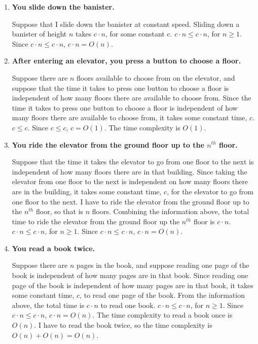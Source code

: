 \documentclass[10pt]{article}
\begin{document}
\begin{enumerate}
\begin{enumerate}
				\item \textbf{You slide down the banister.}
					
					\vspace{0.5cm}
					Suppose that I slide down the banister at constant speed. Sliding down a banister of height $n$ takes $c \cdot n$, for some constant c. $c \cdot n \leq c \cdot n$, for $n \geq 1$. Since $c \cdot n \leq c \cdot n$, $c \cdot n = O(n)$.
					\vspace{0.5cm}
				
				\item \textbf{After entering an elevator, you press a button to choose a floor.}
					
					\vspace{0.5cm}
					Suppose there are $n$ floors available to choose from on the elevator, and suppose that the time it takes to press one button to choose a floor is independent of how many floors there are available to choose from. Since the time it takes to press one button to choose a floor is independent of how many floors there are available to choose from, it takes some constant time, $c$. $c \leq c$. Since $c \leq c$, $c = O(1)$. The time complexity is $O(1)$.
					\vspace{0.5cm}
				
				\item \textbf{You ride the elevator from the ground floor up to the $n^{th}$ floor.}
					
					\vspace{0.5cm}
					Suppose that the time it takes the elevator to go from one floor to the next is independent of how many floors there are in that building. Since taking the elevator from one floor to the next is independent on how many floors there are in the building, it takes some constant time, $c$, for the elevator to go from one floor to the next. I have to ride the elevator from the ground floor up to the $n^{th}$ floor, so that is $n$ floors. Combining the information above, the total time to ride the elevator from the ground floor up the $n^{th}$ floor is $c \cdot n$. $c \cdot n \leq c \cdot n$, for $n \geq 1$. Since $c \cdot n \leq c \cdot n$, $c \cdot n = O(n)$.
					\vspace{0.5cm}
				
				\item \textbf{You read a book twice.}
					
					\vspace{0.5cm}
					Suppose there are $n$ pages in the book, and suppose reading one page of the book is independent of how many pages are in that book. Since reading one page of the book is independent of how many pages are in that book, it takes some constant time, $c$, to read one page of the book. From the information above, the total time is $c \cdot n$ to read one book. $c \cdot n \leq c \cdot n$, for $n \geq 1$. Since $c \cdot n \leq c \cdot n$, $c \cdot n = O(n)$. The time complexity to read a book once is $O(n)$. I have to read the book twice, so the time complexity is $O(n) + O(n) = O(n)$.
			\end{enumerate}
		

\end{enumerate}
\end{document}
